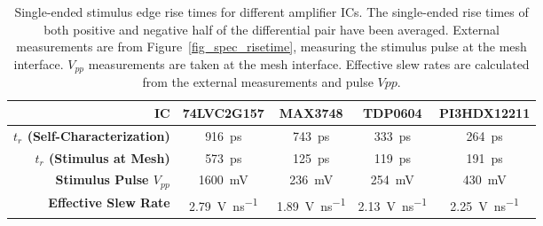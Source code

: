 \documentclass[final]{iacrtrans}
\newcommand{\partno}[1]{\textsf{\small#1}}
\begin{document}
\begin{table}
    \begin{center}
        \begin{tabular}{r|cccc}
            \textbf{IC}
            &\partno{74LVC2G157}
            &\partno{MAX3748}
            &\partno{TDP0604}
            &\partno{PI3HDX12211}\\\hline

            \textbf{$t_r$ (Self-Characterization)}&
            \qty{916}{\pico\second}&
            \qty{743}{\pico\second}&
            \qty{333}{\pico\second}&
            \qty{264}{\pico\second}\\

            \textbf{$t_r$ (Stimulus at Mesh)}&
            \qty{573}{\pico\second}&
            \qty{125}{\pico\second}&
            \qty{119}{\pico\second}&
            \qty{191}{\pico\second}\\

            \textbf{Stimulus Pulse $V_{pp}$}&
            \qty{1600}{\milli\volt}&
            \qty{236}{\milli\volt}&
            \qty{254}{\milli\volt}&
            \qty{430}{\milli\volt}\\

            \textbf{Effective Slew Rate}&
            \qty{2.79}{\volt\per\nano\second}&
            \qty{1.89}{\volt\per\nano\second}&
            \qty{2.13}{\volt\per\nano\second}&
            \qty{2.25}{\volt\per\nano\second}
        \end{tabular}
    \end{center}
    \caption{Single-ended stimulus edge rise times for different amplifier ICs. The single-ended rise times of both
    positive and negative half of the differential pair have been averaged. External measurements are from Figure\
    \ref{fig_spec_risetime}, measuring the stimulus pulse at the mesh interface. $V_{pp}$ measurements are taken at the
    mesh interface. Effective slew rates are calculated from the external measurements and pulse $V{pp}$.}
    \label{tab_edge_risetime}
\end{table}
\end{document}
